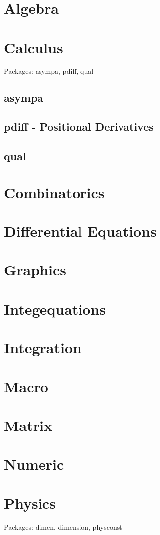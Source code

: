 \documentclass[oneside,english]{book}
\begin{document}
\chapter{Algebra}
\chapter{Calculus}
   Packages:  asympa, pdiff, qual
   \section{asympa}
%   
   \pagebreak
   \section{pdiff - Positional Derivatives}
   
   \pagebreak
   \section{qual}
%      
\chapter{Combinatorics}
\chapter{Differential Equations}
\chapter{Graphics}
\chapter{Integequations}
\chapter{Integration}
\chapter{Macro}
\chapter{Matrix}
\chapter{Numeric}
\chapter{Physics}
   Packages:  dimen, dimension, physconst
\end{document}
